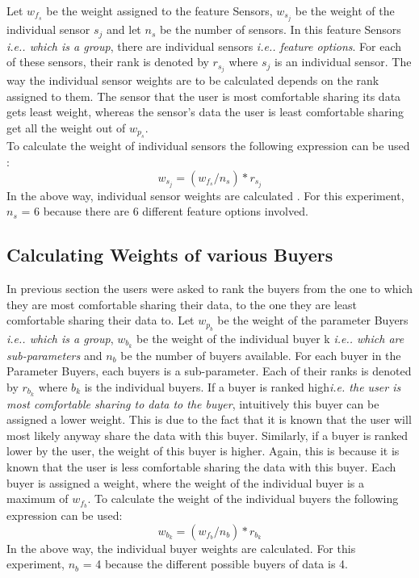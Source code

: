 Let $w_{f_{s}}$ be the weight assigned to the feature Sensors, $w_{s_{j}}$ be the weight of the individual sensor $s_j$ and let $n_s$ be the number of sensors. In this feature Sensors {\it i.e.. which is a group}, there are individual sensors {\it i.e.. feature options}.
For each of these sensors, their rank is denoted by $r_{s_{j}}$ where $s_j$ is an individual sensor. The way the individual sensor weights are to be 
calculated depends on the rank assigned to them. The sensor that the user is most comfortable sharing its data gets least weight, whereas the sensor's
data the user is least comfortable sharing get all the weight out of $w_{p_{s}}$.\\
To calculate the weight of individual sensors the following expression can be used :
$$w_{s_{j}} = (w_{f_{s}}/n_s)*r_{s_{j}}$$
In the above way, individual sensor weights are calculated . For this experiment, $n_s$ = 6 because there are 6 different feature options involved.

\subsection{Calculating Weights of various Buyers}
In previous section the users were asked to rank the buyers from the one to which they are most comfortable sharing their data,
to the one they are least comfortable sharing their data to. Let $w_{p_{b}}$ be the weight of the parameter Buyers {\it i.e.. which is a group}, $w_{b_{k}}$ be the weight of
the individual buyer k {\it i.e.. which are sub-parameters} and $n_b$ be the number of buyers available. For each buyer in the Parameter Buyers, each buyers is a sub-parameter.
Each of their ranks is denoted by $r_{b_{k}}$ where $b_k$ is the individual buyers.  If a buyer is ranked high{\it i.e. the user is most comfortable sharing to data to the buyer}, intuitively this buyer can be assigned a lower weight.
This is due to the fact that it is known that the user will most likely anyway share the data with this buyer. Similarly, if a buyer is ranked lower by the user, the weight of this buyer is higher. Again,
this is because it is known that the user is less comfortable sharing the data with this buyer.
Each buyer is assigned a weight, where the weight of the individual
buyer is a maximum of $w_{f_{b}}$. To calculate the weight of the individual buyers the following expression can be used:
$$w_{b_{k}} = (w_{f_{b}}/n_b)*r_{b_{k}}$$
In the above way, the individual buyer weights are calculated. For this experiment, $n_b$ = 4 because the different possible buyers of data is 4.




